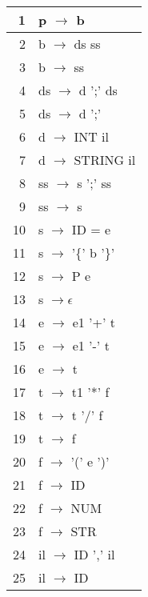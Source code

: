 \vspace{0.5cm}
\begin{small}
\begin{center}
\begin{tabular}{|r|l|}
\hline
1 &  p  $\rightarrow$  b     \\
\hline
2 &  b  $\rightarrow$  ds  ss     \\
\hline
3 &  b  $\rightarrow$  ss         \\
\hline
4 &  ds $\rightarrow$ d  ';'  ds  \\
\hline
5 &  ds $\rightarrow$  d ';'      \\
\hline
6 &  d  $\rightarrow$ INT  il     \\
\hline
7 &  d  $\rightarrow$  STRING  il \\
\hline
8 &  ss $\rightarrow$ s  ';'  ss  \\
\hline
9 &  ss $\rightarrow$  s          \\
\hline
10 &  s  $\rightarrow$ ID = e   \\
\hline
11 &  s  $\rightarrow$ '\{' b '\}'   \\
\hline
12 &  s  $\rightarrow$  P  e       \\
\hline
13 &  s $\rightarrow \epsilon$    \\
\hline
14 &  e $\rightarrow$ e1 '+' t    \\
\hline
15 &  e $\rightarrow$ e1 '-' t    \\
\hline
16 &  e $\rightarrow$ t           \\
\hline
17 &  t $\rightarrow$ t1 '*' f    \\
\hline
18 &  t $\rightarrow$ t '/' f     \\
\hline
19 &  t $\rightarrow$ f           \\
\hline
20 &  f $\rightarrow$ '(' e ')'   \\
\hline
21 &  f $\rightarrow$  ID         \\
\hline
22 &  f $\rightarrow$  NUM        \\
\hline
23 &  f $\rightarrow$  STR        \\
\hline
24 &  il $\rightarrow$ ID ',' il  \\
\hline
25 &  il $\rightarrow$ ID         \\
\hline
\end{tabular}
\end{center}
\end{small}
\vspace{0.25cm}



